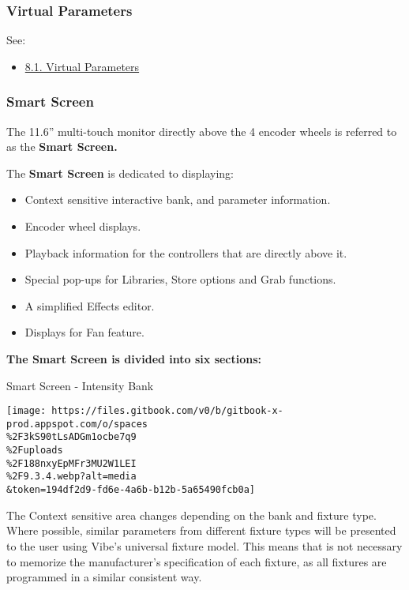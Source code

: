 \documentclass[
]{article}
\providecommand{\tightlist}{%
  \setlength{\itemsep}{0pt}\setlength{\parskip}{0pt}}
\begin{document}
\hypertarget{virtual-parameters}{%
\subsubsection{Virtual Parameters}\label{virtual-parameters}}

See:

\begin{itemize}
\tightlist
\item
  \href{https://vibemanual.compulite.com/programming-concepts.html\#operational-philosophy}{8.1. Virtual Parameters}
\end{itemize}

\hypertarget{smart-screen-1}{%
\subsubsection{Smart Screen}\label{smart-screen-1}}

The 11.6'' multi-touch monitor directly above the 4 encoder wheels is referred to as the \textbf{Smart Screen.}

The \textbf{Smart Screen} is dedicated to displaying:

\begin{itemize}
\item
  Context sensitive interactive bank, and parameter information.
\item
  Encoder wheel displays.
\item
  Playback information for the controllers that are directly above it.
\item
  Special pop-ups for Libraries, Store options and Grab functions.
\item
  A simplified Effects editor.
\item
  Displays for Fan feature.
\end{itemize}

\textbf{The Smart Screen is divided into six sections:}

Smart Screen - Intensity Bank

\texttt{[image: https://files.gitbook.com/v0/b/gitbook-x-prod.appspot.com/o/spaces\\\%2F3kS90tLsADGm1ocbe7q9\\\%2Fuploads\\\%2F188nxyEpMFr3MU2W1LEI\\\%2F9.3.4.webp?alt=media\\\&token=194df2d9-fd6e-4a6b-b12b-5a65490fcb0a]}

The Context sensitive area changes depending on the bank and fixture type. Where possible, similar parameters from different fixture types will be presented to the user using Vibe's universal fixture model. This means that is not necessary to memorize the manufacturer's specification of each fixture, as all fixtures are programmed in a similar consistent way.
\end{document}
